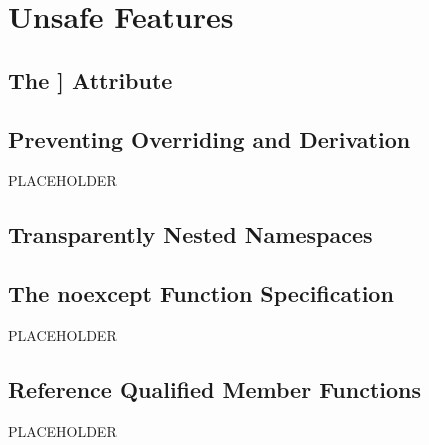 
\chapter[Unsafe Features]{Unsafe Features}\label{ch-unsafe}

\renewcommand{\cppxx}{C++11}

\newpage
{}
 \section[{\tt carries\_dependency}]{The {\SecCode [[carries\_dependency]]} Attribute}\label{carriesdependency}


\newpage
\section[{\tt final}]{Preventing Overriding and Derivation}\label{final}
%
PLACEHOLDER

\newpage
\section[{\tt inline} {\tt namespace}]{Transparently Nested Namespaces}\label{inline-namespaces}%


\newpage
\section[{\tt noexcept} Specifier]{The {\SecCode noexcept} Function Specification}\label{noexcept-specifier}
%
PLACEHOLDER

\newpage
\section[Ref-Qualifiers]{Reference Qualified Member Functions}\label{refqualifiers}
%
PLACEHOLDER


\renewcommand{\cppxx}{C++14}

